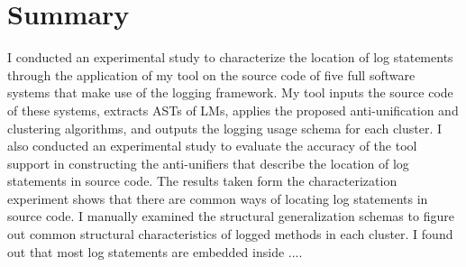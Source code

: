 \section{Summary}
I conducted an experimental study to characterize the location of log statements through the application of my tool on the source code of five full software systems that make use of the  logging framework. My tool inputs the source code of these systems, extracts ASTs of LMs, applies the proposed anti-unification and clustering algorithms, and outputs the logging usage schema for each cluster. I also conducted an experimental study to evaluate the accuracy of the tool support in constructing the anti-unifiers that describe the location of log statements in source code. The results taken form the characterization experiment shows that there are common ways of locating log statements in source code. I manually examined the structural generalization schemas to figure out common structural characteristics of logged methods in each cluster. I found out that most log statements are embedded inside ....
